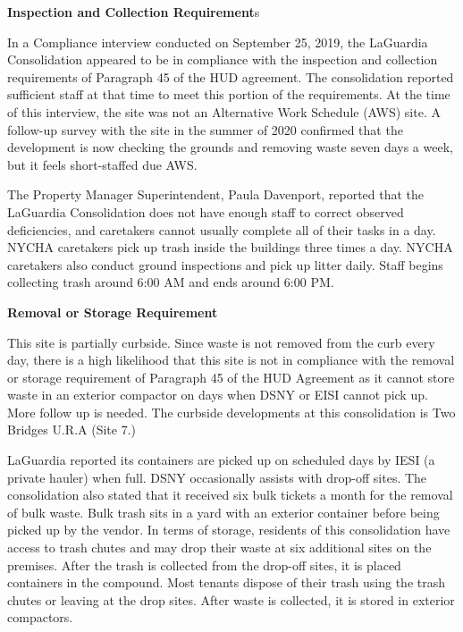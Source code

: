 
\textbf{Inspection and Collection Requirement}s

In a Compliance interview conducted on September 25, 2019, the LaGuardia Consolidation appeared to be in compliance with the inspection and collection requirements of Paragraph 45 of the HUD agreement. The consolidation reported sufficient staff at that time to meet this portion of the requirements. At the time of this interview, the site was not an Alternative Work Schedule (AWS) site. A follow-up survey with the site in the summer of 2020 confirmed that the development is now checking the grounds and removing waste seven days a week, but it feels short-staffed due AWS. 

The Property Manager Superintendent, Paula Davenport, reported that the LaGuardia Consolidation does not have enough staff to correct observed deficiencies, and caretakers cannot usually complete all of their tasks in a day. NYCHA caretakers pick up trash inside the buildings three times a day. NYCHA caretakers also conduct ground inspections and pick up litter daily. Staff begins collecting trash around 6:00 AM and ends around 6:00 PM.

\textbf{Removal or Storage Requirement}

This site is partially curbside. Since waste is not removed from the curb every day, there is a high likelihood that this site is not in compliance with the removal or storage requirement of Paragraph  45 of the HUD Agreement as it cannot store waste in an exterior compactor on days when DSNY or EISI cannot pick up. More follow up is needed. The curbside developments at this consolidation is Two Bridges U.R.A (Site 7.)



LaGuardia reported its containers are picked up on scheduled days by IESI (a private hauler) when full. DSNY occasionally assists with drop-off sites.  The consolidation also stated that it received six bulk tickets a month for the removal of bulk waste. Bulk trash sits in a yard with an exterior container before being picked up by the vendor. In terms of storage, residents of this consolidation have access to trash chutes and may drop their waste at six additional sites on the premises. After the trash is collected from the drop-off sites, it is placed containers in the compound. Most tenants dispose of their trash using the trash chutes or leaving at the drop sites. After waste is collected, it is stored in exterior compactors.  




